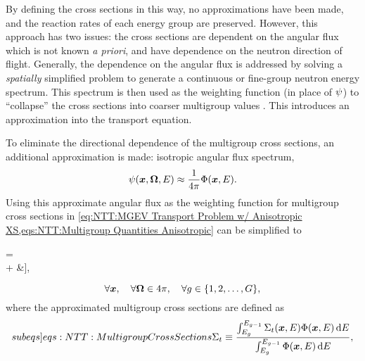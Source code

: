 {{{{        By defining the cross sections in this way, no approximations have been made, and the reaction rates of each energy group are preserved.
        However, this approach has two issues: the cross sections are dependent on the angular flux which is not known \textit{a priori}, and have dependence on the neutron direction of flight.
        Generally, the dependence on the angular flux is addressed by solving a \emph{spatially} simplified problem to generate a continuous or fine-group neutron energy spectrum.
        This spectrum is then used as the weighting function (in place of $\psi$) to ``collapse'' the cross sections into coarser multigroup values \cite{Knott2010}.
        This introduces an approximation into the transport equation.

        To eliminate the directional dependence of the multigroup cross sections, an additional approximation is made: isotropic angular flux spectrum,
        \begin{equation}\label{eq:NTT:Multigroup Isotropic Spectrum}
          \psi(\boldsymbol{x},\boldsymbol{\Omega},E) \approx \frac{1}{4\pi}\Phi(\boldsymbol{x}, E).
        \end{equation}
        Using this approximate angular flux as the weighting function for multigroup cross sections in \cref{eq:NTT:MGEV Transport Problem w/ Anisotropic XS,eqs:NTT:Multigroup Quantities Anisotropic} can be simplified to
        \begin{aequation}\label{eq:NTT:MGEV Transport Problem}
          \left[\dir\vdot\grad + \xst\right]\aflux = \rfourpi\Bigg[&\suml[\gprime=1][G]\intl[\fourpi]\xss\aflux[\loc][\dirprime][\gprime]\ddirprime\\
              + \frac{\spect}{\keff}&\suml[\gprime=1][G]\nufis\intl[\fourpi]\aflux[\loc][\dirprime][\gprime]\ddirprime\Bigg],
        \end{aequation}
        \begin{equation*}
          \forall\boldsymbol{x}, \quad \forall\boldsymbol{\Omega}\in4\pi,\quad \forall g\in\{1,2,\ldots,G\},
        \end{equation*}
        where the approximated multigroup cross sections are defined as
        \begin{subequations}\label[subeqs]{eqs:NTT:Multigroup Cross Sections}
          \begin{equation}\label{eq:NTT:Multigroup Total Cross Section}
            \xst \defined \frac{\intl[E_{g}][E_{g-1}]\CrossSection_{t}(\loc,E)\FluxSpectrum(\loc,E)\dif{E}}{\intl[E_{g}][E_{g-1}]\FluxSpectrum(\loc,E)\dif{E}},
          \end{equation}

\end{subequations}}}}}
